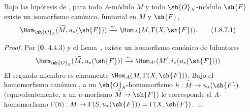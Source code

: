 \begin{corollary}[1.8.7]
\label{ega2:addendum:I.1.8.7-fr}
Bajo las hipótesis de , para todo $A$-módulo $M$ y todo
$\sh{O}_X$-módulo $\sh{F}$ existe un isomorfismo canónico, funtorial
en $M$ y $\sh{F}$,
\begin{equation}
\label{ega2:addendum:I.1.8.7.1-fr}
  \Hom_{\sh{O}_S}(\widetilde M,u_*(\sh{F}))
  \xrightarrow{\sim}\Hom_A(M,\Gamma(X,\sh{F})).
\tag{1.8.7.1}
\end{equation}
\end{corollary}

\begin{proof}
Por (\textbf 0, 4.4.3) y el Lema~, existe un isomorfismo
canónico de bifuntores
\[
  \Hom_{\sh{O}_S}(\widetilde M,u_*(\sh{F}))
  \xrightarrow{\sim}\Hom_{A'}(M',i_*(u_*(\sh{F})))
\]
El segundo miembro es claramente $\Hom_A(M,\Gamma(X,\sh{F}))$. Bajo
el homomorfismo canónico , a un
$\sh{O}_S$-homomorfismo
$h:\widetilde M\to u_*(\sh{F})$ (equivalentemente, a un $u$-morfismo
$\widetilde M\to\sh{F}$) le corresponde el $A$-homomorfismo $\Gamma(h):M\to\Gamma(S,u_*(\sh{F}))=\Gamma(X,\sh{F})$.
\end{proof}

